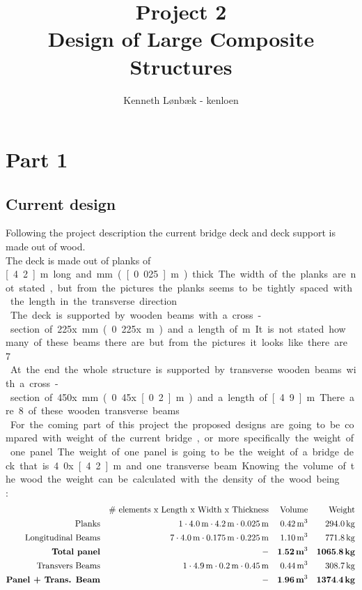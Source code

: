 \documentclass[10pt,a4paper,20pt]{article}
\title{\textbf{Project 2} \\Design of Large Composite Structures}
\date{}
\author{Kenneth Lønbæk - kenloen}
\begin{document}
\maketitle  
\section{Part 1}

\subsection{Current design}
Following the project description \cite{ProbDecib} the current bridge deck and deck support is made out of wood. \\
The deck is made out of planks of \unit[4.2]{m} long and \unit[25]{mm} (\unit[0.025]{m}) thick. The width of the planks are not stated, but from the pictures the planks seems to be tightly spaced with the length in the transverse direction.\\
The deck is supported by wooden beams with a cross-section of 225x\unit[175]{mm} (0.225x\unit[175]{m}) and a length of \unit[4]{m}. It is not stated how many of these beams there are but from the pictures it looks like there are 7. \\
At the end the whole structure is supported by transverse wooden beams with a cross-section of 450x\unit[200]{mm} (0.45x\unit[0.2]{m}) and a length of \unit[4.9]{m}. There are 8 of these wooden transverse beams.\\
For the coming part of this project the proposed designs are going to be compared with weight of the current bridge, or more specifically the weight of one panel. The weight of one panel is going to be the weight of a bridge deck that is 4.0x\unit[4.2]{m} and one transverse beam. Knowing the volume of the wood the weight can be calculated with the density of the wood being  \cite[p. 4]{ProbDecib}:
\begin{align}
&& \#\text{ elements x Length x Width x Thickness} && \text{Volume} && \text{Weight}\nonumber\\
\text{Planks} && 1\cdot\unit[4.0]{m}\cdot\unit[4.2]{m}\cdot\unit[0.025]{m} && \unit[0.42]{m^3} && \unit[294.0]{kg}\nonumber\\
\text{Longitudinal Beams} && 7\cdot\unit[4.0]{m}\cdot\unit[0.175]{m}\cdot\unit[0.225]{m} && \unit[1.10]{m^3}&& \unit[771.8]{kg}\nonumber\\
\textbf{Total panel} && - && \mathbf{\unit[1.52]{\textbf{m}^3}}&& \mathbf{\unit[1065.8]{\textbf{kg}}}\nonumber\\
\text{Transvers Beams} && 1\cdot\unit[4.9]{m}\cdot\unit[0.2]{m}\cdot\unit[0.45]{m} && \unit[0.44]{m^3} && \unit[308.7]{kg} \nonumber\\
\textbf{Panel + Trans. Beam} && - && \mathbf{\unit[1.96]{\textbf{m}^3}}&& \mathbf{\unit[1374.4]{\textbf{kg}}}
\end{align} 
\end{document}
